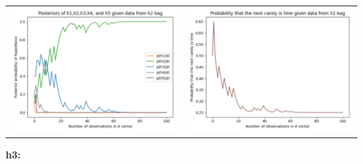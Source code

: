 \documentclass[]{article}
\begin{document}
\begin{center}
    \begin{tabular}{cc}
    \includegraphics[scale = 0.30]{2_a_posteriors_h2.png} & \includegraphics[scale = 0.30]{2_a_lime_h2.png} 
\end{tabular}
\end{center}
\textbf{h3:}
\end{document}
